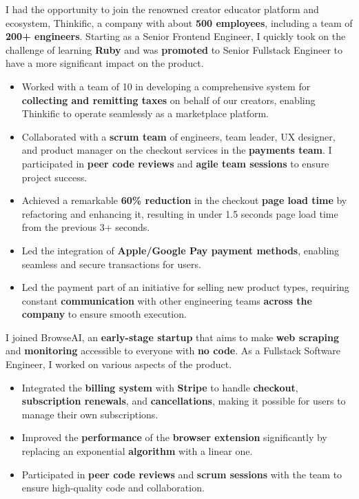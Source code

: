 \bigskip
{}
I had the opportunity to join the renowned creator educator platform and ecosystem, Thinkific, a company with about \textbf{500 employees}, including a team of \textbf{200+ engineers}. Starting as a Senior Frontend Engineer, I quickly took on the challenge of learning \textbf{Ruby} and was \textbf{promoted} to Senior Fullstack Engineer to have a more significant impact on the product.
\medskip
\begin{itemize}
    \item Worked with a team of 10 in developing a comprehensive system for \textbf{collecting and remitting taxes} on behalf of our creators, enabling Thinkific to operate seamlessly as a marketplace platform.
    \item Collaborated with a \textbf{scrum team} of engineers, team leader, UX designer, and product manager on the checkout services in the \textbf{payments team}. I participated in \textbf{peer code reviews} and \textbf{agile team sessions} to ensure project success.
    \item Achieved a remarkable \textbf{60\% reduction} in the checkout \textbf{page load time} by refactoring and enhancing it, resulting in under 1.5 seconds page load time from the previous 3+ seconds.
    \item Led the integration of \textbf{Apple/Google Pay payment methods}, enabling seamless and secure transactions for users.
    \item Led the payment part of an initiative for selling new product types, requiring constant \textbf{communication} with other engineering teams \textbf{across the company} to ensure smooth execution.
\end{itemize}

\bigskip
\divider
\bigskip

I joined BrowseAI, an \textbf{early-stage startup} that aims to make \textbf{web scraping} and \textbf{monitoring} accessible to everyone with \textbf{no code}. As a Fullstack Software Engineer, I worked on various aspects of the product.
\medskip
\begin{itemize}
    \item Integrated the \textbf{billing system} with \textbf{Stripe} to handle \textbf{checkout}, \textbf{subscription renewals}, and \textbf{cancellations}, making it possible for users to manage their own subscriptions.
    \item Improved the \textbf{performance} of the \textbf{browser extension} significantly by replacing an exponential \textbf{algorithm} with a linear one.
    \item Participated in \textbf{peer code reviews} and \textbf{scrum sessions} with the team to ensure high-quality code and collaboration.
\end{itemize}

